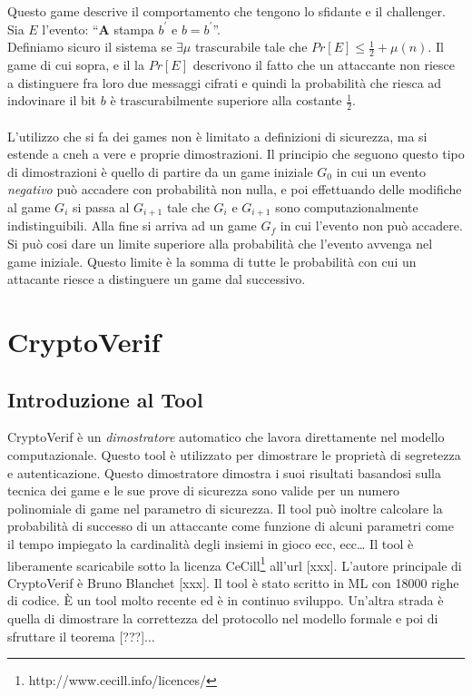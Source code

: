 \documentclass[a4paper,openright,twoside,12pt]{report}
\begin{document}
Questo game descrive il comportamento che tengono lo sfidante e il challenger. 
Sia $E$ l'evento: ``\textbf{A} stampa $b^{'}$ e $b=b^{'}$''.\\ 
Definiamo sicuro il sistema se $\exists \mu$ trascurabile tale che $Pr[E]\leq \frac{1}{2} + \mu(n)$.
Il game di cui sopra, e il la $Pr[E]$ descrivono il fatto che un attaccante non riesce a distinguere fra loro due messaggi cifrati e quindi la probabilit\`a che riesca ad
indovinare il bit $b$ \`e trascurabilmente superiore alla costante $\frac{1}{2}$.\\
\\
L'utilizzo che si fa dei games non \`e limitato a definizioni di sicurezza, ma si estende a cneh a vere e proprie dimostrazioni.
Il principio che seguono questo tipo di dimostrazioni \`e quello di partire da un game iniziale $G_0$ in cui un evento \emph{negativo} pu\`o accadere con probabilit\`a non nulla,
e poi effettuando delle modifiche al game $G_i$ si passa al $G_{i+1}$ tale che $G_i$ e $G_{i+1}$ sono computazionalmente indistinguibili.
Alla fine si arriva ad un game $G_f$ in cui l'evento non pu\`o accadere. 
Si può cosi dare un limite superiore alla probabilit\`a che l'evento avvenga nel game iniziale. Questo limite \`e la somma di tutte le probabilit\`a con cui un attacante
riesce a distinguere un game dal successivo.








\chapter{CryptoVerif}
\section{Introduzione al Tool}
CryptoVerif \`e un \emph{dimostratore} automatico che lavora direttamente nel modello computazionale.
Questo tool \`e utilizzato per dimostrare le propriet\`a di segretezza e autenticazione. Questo dimostratore dimostra i suoi risultati basandosi sulla tecnica dei 
game e le sue prove di sicurezza sono valide per un numero polinomiale di game nel parametro di sicurezza. Il tool pu\`o inoltre calcolare la probabilit\`a di successo
di un attaccante come funzione di alcuni parametri come il tempo impiegato la cardinalit\`a degli insiemi in gioco ecc, ecc\dots
Il tool \`e liberamente scaricabile sotto la licenza CeCill\footnote{http://www.cecill.info/licences/} all'url [xxx].
L'autore principale di CryptoVerif \`e Bruno Blanchet [xxx].
Il tool \`e stato scritto in ML con 18000 righe di codice.
\`E un tool molto recente ed \`e in continuo sviluppo.
Un'altra strada \`e quella di dimostrare la correttezza del protocollo nel modello formale e poi di sfruttare il teorema [???]...
\end{document}
